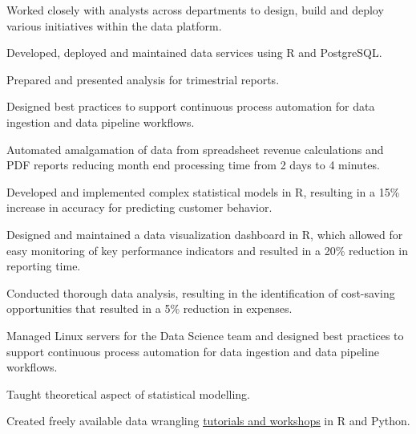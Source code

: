 \documentclass[]{plushcv}
\begin{document}
\begin{minipage}[t]{0.70\textwidth}
\begin{tightemize}
\sectionsep
\item Worked closely with analysts across departments to design, build and deploy various initiatives within the data platform.
\item Developed, deployed and maintained data services using R and PostgreSQL.
\item Prepared and presented analysis for trimestrial reports.
\item Designed best practices to support continuous process automation for data ingestion and data pipeline workflows.
\item Automated amalgamation of data from spreadsheet revenue calculations and PDF reports reducing month end processing time from 2 days to 4 minutes.
\end{tightemize}
\sectionsep




\begin{tightemize}
\sectionsep
\item Developed and implemented complex statistical models in R, resulting in a 15\% increase in accuracy for predicting customer behavior.
\item Designed and maintained a data visualization dashboard in R, which allowed for easy monitoring of key performance indicators and resulted in a 20\% reduction in reporting time.
\item Conducted thorough data analysis, resulting in the identification of cost-saving opportunities that resulted in a 5\% reduction in expenses.
\item Managed Linux servers for the Data Science team and designed best practices to support continuous process automation for data ingestion and data pipeline workflows.

\end{tightemize}
\sectionsep

\begin{tightemize}
\sectionsep
\item Taught theoretical aspect of statistical modelling.
\item Created freely available data wrangling
\href{https://munoztd0.github.io/Hitchhikers_guide_to_the_brain/}{\underline{tutorials and workshops}} in R and Python.
\end{tightemize}
\sectionsep


\end{minipage}
\end{document}
